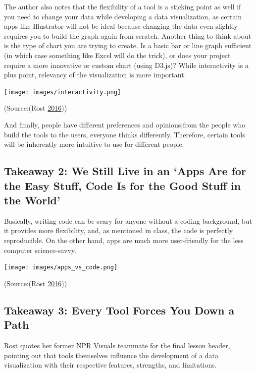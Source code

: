 \documentclass[]{book}
\begin{document}
The author also notes that the flexibility of a tool is a sticking point as well if you need to change your data while developing a data visualization, as certain apps like Illustrator will not be ideal because changing the data even slightly requires you to build the graph again from scratch. Another thing to think about is the type of chart you are trying to create. Is a basic bar or line graph sufficient (in which case something like Excel will do the trick), or does your project require a more innovative or custom chart (using D3.js)? While interactivity is a plus point, relevancy of the visualization is more important.

\texttt{[image: images/interactivity.png]}

(Source:(Rost \protect\hyperlink{ref-different_tools}{2016}))

And finally, people have different preferences and opinions;from the people who build the tools to the users, everyone thinks differently. Therefore, certain tools will be inherently more intuitive to use for different people.

\hypertarget{takeaway-2-we-still-live-in-an-apps-are-for-the-easy-stuff-code-is-for-the-good-stuff-in-the-world}{%
\subsection{Takeaway 2: We Still Live in an `Apps Are for the Easy Stuff, Code Is for the Good Stuff in the World'}\label{takeaway-2-we-still-live-in-an-apps-are-for-the-easy-stuff-code-is-for-the-good-stuff-in-the-world}}

Basically, writing code can be scary for anyone without a coding background, but it provides more flexibility, and, as mentioned in class, the code is perfectly reproducible. On the other hand, apps are much more user-friendly for the less computer science-savvy.

\texttt{[image: images/apps\_vs\_code.png]}

(Source:(Rost \protect\hyperlink{ref-different_tools}{2016}))

\hypertarget{takeaway-3-every-tool-forces-you-down-a-path}{%
\subsection{Takeaway 3: Every Tool Forces You Down a Path}\label{takeaway-3-every-tool-forces-you-down-a-path}}

Rost quotes her former NPR Visuals teammate for the final lesson header, pointing out that tools themselves influence the development of a data visualization with their respective features, strengths, and limitations.
\end{document}
